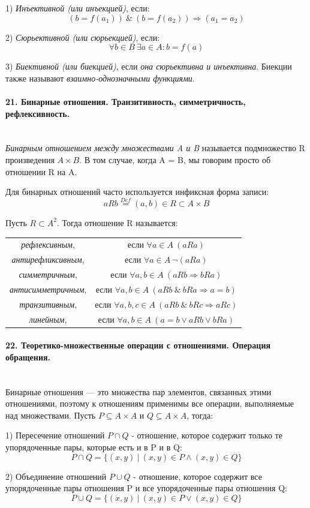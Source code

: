\documentclass[a4paper, 12pt]{article}
\newcommand{\parag}[1]{\paragraph{#1}\mbox{}\\}
\begin{document}
1) \textit{Инъективной (или инъекцией)}, если:
\[
    (b = f(a_{1}))\ \&\ (b = f(a_{2})) \Rightarrow (a_{1} = a_{2})
\]

2) \textit{Сюрьективной (или сюрьекцией)}, если:
\[
    \forall b \in B\ \exists a \in A: b = f(a)
\]

3) \textit{Биективной (или биекцией)}, если \textit{она сюрьективна и инъективна}. Биекции также называют \textit{взаимно-однозначными функциями}. 

\parag{21. Бинарные отношения. Транзитивность, симметричность, рефлексивность.}
\textit{Бинарным отношением между множествами A и B} называется подмножество R произведения $A \times B$. В том случае, когда A = B, мы говорим просто об отношении R на A.

Для бинарных отношений часто используется инфиксная форма записи:
\[
    aRb \overset{Def}{=} (a, b) \in R \subset A \times B 
\]

Пусть $R \subset A^{2}$. Тогда отношение R называется:

\begin{center}
\begin{tabular}{cc}
    \textit{рефлексивным}, & если $\forall a \in A\ (aRa)$ \\
    \textit{антирефликсивным}, & если $\forall a \in A\ \neg(aRa)$ \\
    \textit{симметричным}, & если $\forall a, b \in A\ (aRb \Rightarrow bRa)$ \\
    \textit{антисимметричным}, & если $\forall a, b \in A\ (aRb\ \&\ bRa \Rightarrow a = b)$ \\
    \textit{транзитивным}, & если $\forall a, b, c \in A\ (aRb\ \&\ bRc \Rightarrow aRc)$ \\
    \textit{линейным}, & если $\forall a, b \in A\ (a = b \lor aRb \lor bRa)$
\end{tabular}
\end{center}

\parag{22. Теоретико-множественные операции с отношениями. Операция обращения.}
Бинарные отношения — это множества пар элементов, связанных этими отношениями, поэтому к отношениям применимы все операции, выполняемые над множествами. Пусть $P \subseteq A \times A$ и $Q \subseteq A \times A$, тогда:

1) Пересечение отношений $P \cap Q$ - отношение, которое содержит только те упорядоченные пары, которые есть и в P и в Q:
\[
    P \cap Q = \{(x, y)\ |\ (x, y) \in P \land (x, y) \in Q\}
\]

2) Объединение отношений $P \cup Q$ - отношение, которое содержит все упорядоченные пары отношения P и все упорядоченные пары отношения Q:
\[
    P \cup Q = \{(x, y)\ |\ (x, y) \in P \lor (x, y) \in Q\}
\]
\end{document}

